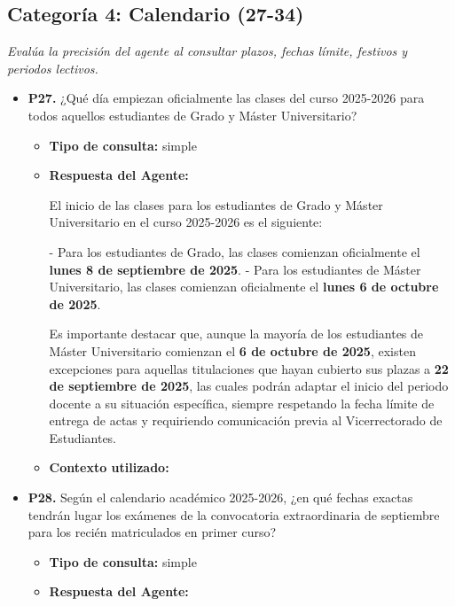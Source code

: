 \documentclass{article}
\begin{document}
\subsection{Categoría 4: Calendario (27-34)}
\textit{Evalúa la precisión del agente al consultar plazos, fechas límite, festivos y periodos lectivos.}
\begin{itemize}
      \item \textbf{P27.} ¿Qué día empiezan oficialmente las clases del curso 2025-2026 para todos aquellos estudiantes de Grado y Máster Universitario? \\
            \begin{itemize}
                  \item \textbf{Tipo de consulta:} simple
                  \item \textbf{Respuesta del Agente:}

                        El inicio de las clases para los estudiantes de Grado y Máster Universitario en el curso 2025-2026 es el siguiente:

                        - Para los estudiantes de Grado, las clases comienzan oficialmente el \textbf{lunes 8 de septiembre de 2025}.
                        - Para los estudiantes de Máster Universitario, las clases comienzan oficialmente el \textbf{lunes 6 de octubre de 2025}.

                        Es importante destacar que, aunque la mayoría de los estudiantes de Máster Universitario comienzan el \textbf{6 de octubre de 2025}, existen excepciones para aquellas titulaciones que hayan cubierto sus plazas a \textbf{22 de septiembre de 2025}, las cuales podrán adaptar el inicio del periodo docente a su situación específica, siempre respetando la fecha límite de entrega de actas y requiriendo comunicación previa al Vicerrectorado de Estudiantes.
                  \item \textbf{Contexto utilizado:}

            \end{itemize}

      \item \textbf{P28.} Según el calendario académico 2025-2026, ¿en qué fechas exactas tendrán lugar los exámenes de la convocatoria extraordinaria de septiembre para los recién matriculados en primer curso? \\
            \begin{itemize}
                  \item \textbf{Tipo de consulta:} simple
                  \item \textbf{Respuesta del Agente:}


\end{itemize}
\end{itemize}
\end{document}
